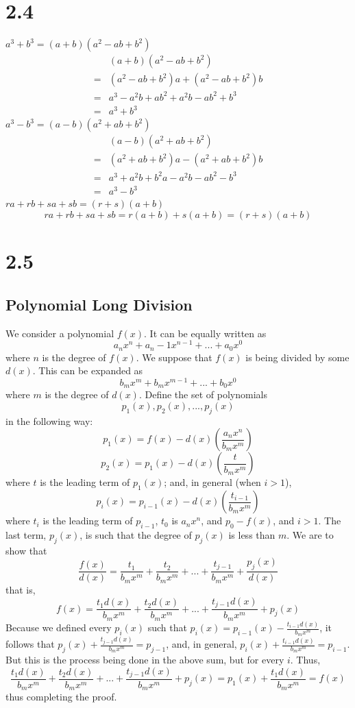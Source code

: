 \documentclass{article}
\theoremstyle{definition}
\begin{document}
\section*{2.4}
$a^3+b^3=(a+b)(a^2-ab+b^2)$
\[
\begin{array}{rl}
	& (a+b)(a^2-ab+b^2) \\
=	& (a^2-ab+b^2)a+(a^2-ab+b^2)b \\
=	& a^3-a^2b+ab^2+a^2b-ab^2+b^3 \\
=	& a^3+b^3
\end{array}
\]
$a^3-b^3=(a-b)(a^2+ab+b^2)$
\[
\begin{array}{rl}
	& (a-b)(a^2+ab+b^2) \\
=	& (a^2+ab+b^2)a-(a^2+ab+b^2)b \\
=	& a^3+a^2b+b^2a-a^2b-ab^2-b^3 \\
=	& a^3-b^3
\end{array}
\]
$ra+rb+sa+sb=(r+s)(a+b)$
\[ ra+rb+sa+sb=r(a+b)+s(a+b)=(r+s)(a+b) \]

\section*{2.5}

\subsection*{Polynomial Long Division}


We consider a polynomial $f(x)$. It can be equally written as \[ a_nx^n+a_n-1x^{n-1}+...+a_0x^0 \] where $n$ is the degree of $f(x)$. We suppose 
that $f(x)$ is being divided by some $d(x)$. This can be expanded as \[ b_mx^m+b_mx^{m-1}+...+b_0x^0 \] where $m$ is the degree of $d(x)$. Define 
the set of polynomials \[ p_1(x),p_2(x),...,p_j(x) \] in the following way: \[ p_1(x)=f(x)-d(x)(\frac{a_nx^n}{b_mx^m}) \]
\[ p_2(x)=p_1(x)-d(x)(\frac{t}{b_mx^m}) \] where $t$ is the leading term of $p_1(x)$; and, in general (when $i>1$),
 \[ p_i(x)=p_{i-1}(x)-d(x)(\frac{t_{i-1}}{b_mx^m}) \]
 where 
$t_i$ is the leading term of $p_{i-1}$, $t_0$ is $a_nx^n$, and $p_0-f(x)$, and $i>1$. 
The last term, $p_j(x)$, is such that the degree of $p_j(x)$ is less than $m$. We are to show that 
\[ \frac{f(x)}{d(x)}=\frac{t_1}{b_mx^m}+\frac{t_2}{b_mx^m}+...+\frac{t_{j-1}}{b_mx^m}+\frac{p_j(x)}{d(x)} \] that is,
\[ f(x)=\frac{t_1d(x)}{b_mx^m}+\frac{t_2d(x)}{b_mx^m}+...+\frac{t_{j-1}d(x)}{b_mx^m}+p_j(x) \]
Because we defined every $p_i(x)$ such that $p_i(x)=p_{i-1}(x)-\frac{t_{i-1}d(x)}{b_mx^m}$, it follows that $p_j(x)+\frac{t_{j-1}d(x)}{b_mx^m}=p_{j-1}$, 
and, in general, $p_i(x)+\frac{t_{i-1}d(x)}{b_mx^m}=p_{i-1}$. But this is the process being done in the above sum, but for every $i$. Thus,
\[ \frac{t_1d(x)}{b_mx^m}+\frac{t_2d(x)}{b_mx^m}+...+\frac{t_{j-1}d(x)}{b_mx^m}+p_j(x)=p_1(x)+\frac{t_1d(x)}{b_mx^m}=f(x) \] thus completing the proof.
\end{document}
